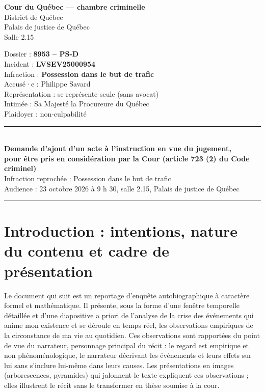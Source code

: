 \documentclass[12pt,letterpaper,oneside]{article}
\begin{document}
\thispagestyle{empty}
\begin{minipage}[t]{0.60\textwidth}
\textbf{Cour du Québec — chambre criminelle}\\
District de Québec\\
Palais de justice de Québec\\
Salle 2.15
\end{minipage}\hfill
\begin{minipage}[t]{0.37\textwidth}
\raggedleft
Dossier : \textbf{8953 – PS-D}\\
Incident : \textbf{LVSEV25000954}\\
Infraction : \textbf{Possession dans le but de trafic}\\
Accusé·e : Philippe Savard\\
Représentation : se représente seule (sans avocat)\\
Intimée : Sa Majesté la Procureure du Québec\\
Plaidoyer : non-culpabilité
\end{minipage}
\vspace{0.8cm}
\begin{center}
\rule{\textwidth}{0.4pt}\\[0.4em]
\textbf{\large Demande d'ajout d'un acte à l'instruction en vue du jugement,}\\[0.15em]\textbf{\large pour être pris en considération par la Cour (article 723 (2) du Code criminel)}\\[0.3em]
Infraction reprochée : Possession dans le but de trafic\\
Audience : 23 octobre 2026 à 9 h 30, salle 2.15, Palais de justice de Québec
\rule{\textwidth}{0.4pt}
\end{center}

\vspace{1em}
\tableofcontents
\newpage

\section*{Introduction : intentions, nature du contenu et cadre de présentation}

Le document qui suit est un reportage d'enquête autobiographique à caractère formel et mathématique. Il présente, sous la forme d'une fenêtre temporelle détaillée et d'une diapositive a priori de l'analyse de la crise des événements qui anime mon existence et se déroule en temps réel, les observations empiriques de la circonstance de ma vie au quotidien. Ces observations sont rapportées du point de vue du narrateur, personnage principal du récit : le regard est empirique et non phénoménologique, le narrateur décrivant les événements et leurs effets sur lui sans s'inclure lui-même dans leurs causes. Les présentations en images (arborescences, pyramides) qui jalonnent le texte expliquent ces observations ; elles illustrent le récit sans le transformer en thèse soumise à la cour.
\end{document}
